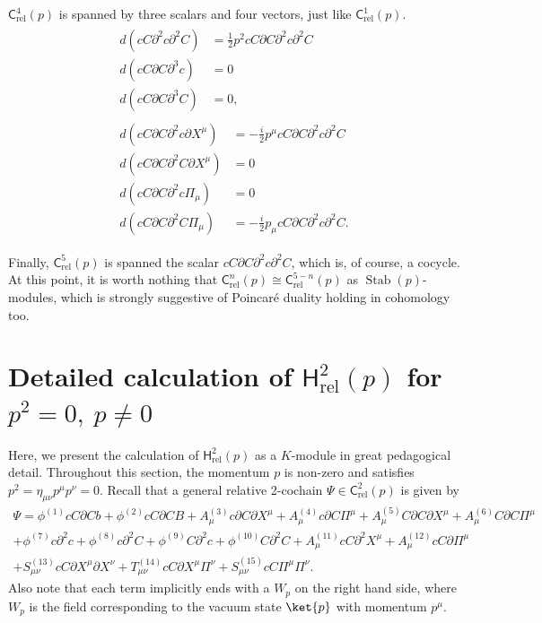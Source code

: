 \documentclass[11pt,reqno,a4paper,final]{amsart}
\theoremstyle{plain}
\theoremstyle{definition}
\renewcommand{\d}{\partial}
\newcommand{\Crel}{\mathsf{C}_{\mathrm{rel}}} %
\newcommand{\Hrel}{\mathsf{H}_{\mathrm{rel}}}
\newcommand{\Stab}{\operatorname{Stab}}
\newcommand{\1}{\mathbb{1}}
\numberwithin{equation}{section}
\begin{document}
\begin{appendices}
$\Crel^4(p)$ is spanned by three scalars and four vectors, just like $\Crel^1(p)$.
\begin{align}
  \begin{split} \label{eq:d-on-scalars-gh-no-4}
    d (c C \d^2 c \d^2 C) &= \tfrac12 p^2 c C \d C \d^2 c \d^2 C\\
    d (c C \d C \d^3 c) &= 0\\
    d (c C \d C \d^3 C) &= 0,
  \end{split} \\[1ex]
  \begin{split} \label{eq:d-on-vectors-gh-no-4}
    d(c C \d C \d^2 c \d X^\mu) &= - \tfrac{i}2 p^\mu c C \d C \d^2 c \d^2 C\\
    d(c C \d C \d^2 C \d X^\mu) &= 0\\
    d(c C \d C \d^2 c \Pi_\mu) &= 0\\
    d(c C \d C \d^2 C \Pi_\mu) &= -\tfrac{i}2 p_\mu c C \d C \d^2 c \d^2 C.
  \end{split}
\end{align}

Finally, $\Crel^5(p)$ is spanned the scalar $c C \d C \d^2 c
\d^2 C$, which is, of course, a cocycle. At this point, it is worth
nothing that $\Crel^{n}(p) \cong \Crel^{5-n}(p)$ as
$\Stab(p)$-modules, which is strongly suggestive of Poincaré duality
holding in cohomology too.

\section{Detailed calculation of $\Hrel^2(p)$ for $p^2=0,\ p\neq 0$}
 \label{app:H2rel-detailed-calc}

Here, we present the calculation of $\Hrel^2(p)$ as a $K$-module in great pedagogical
detail. Throughout this section, the momentum $p$ is non-zero and
satisfies $p^2 = \eta_{\mu\nu} p^\mu p^\nu = 0$. Recall that a general
relative 2-cochain $\Psi \in \Crel^2(p)$ is given by
\begin{multline} \label{eq:gen_C2rel_elem}
  \Psi = \phi^{(1)} c C \d C  b + \phi^{(2)} c C \d C B + A^{(3)}_\mu c \d C \d X^\mu + A^{(4)}_\mu c \d C \Pi^\mu + A^{(5)}_\mu C \d C \d X^\mu + A^{(6)}_\mu C \d C \Pi^\mu\\
  + \phi^{(7)} c \d^2 c + \phi^{(8)} c \d^2 C + \phi^{(9)} C \d^2  c + \phi^{(10)} C \d^2 C + A^{(11)}_\mu c C \d^2 X^\mu + A^{(12)}_\mu c C \d \Pi^\mu\\
  + S^{(13)}_{\mu\nu} c C \d X^\mu \d X^\nu + T^{(14)}_{\mu\nu} c C \d X^\mu \Pi^\nu + S^{(15)}_{\mu\nu} c C \Pi^\mu \Pi^\nu.
\end{multline}
Also note that each term implicitly ends with a $W_p$ on the right
hand side, where $W_p$ is the field corresponding to the vacuum state
$\ket{p}$ with momentum $p^\mu$.


\end{appendices}
\end{document}
